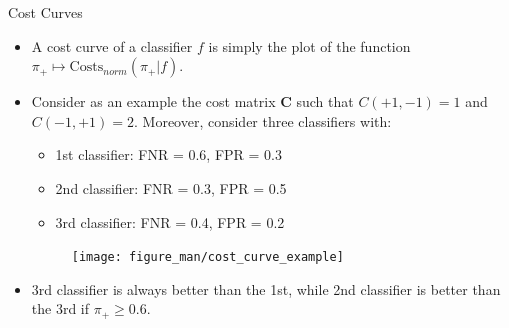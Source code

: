 		\begin{frame}{Cost Curves}
		\footnotesize
			\begin{itemize}
				\item A cost curve of a classifier $f$ is simply the plot of the function $\pi_+ \mapsto \mathrm{Costs}_{norm}(\pi_+ | f).$
				\item Consider as an example the cost matrix $\mathbf{C}$ such that $C(+1,-1)  = 1$ and $C(-1,+1) = 2.$ Moreover, consider three classifiers with:
				\begin{minipage}{0.45\textwidth}
					\begin{itemize}
						\scriptsize
						\item 1st classifier: FNR = 0.6, FPR = 0.3
						\item {\color{red} 2nd classifier}: FNR = 0.3, FPR = 0.5
						\item {\color{green} 3rd classifier}: FNR = 0.4, FPR = 0.2
					\end{itemize}
				\end{minipage}
				\begin{minipage}{0.45\textwidth}
					\begin{figure}
						\centering
						\texttt{[image: figure\_man/cost\_curve\_example]}
					\end{figure}
				\end{minipage}
%			
				\item 3rd classifier is always better than the 1st, while 2nd classifier is better than the 3rd if $\pi_+\geq 0.6.$
			
			\end{itemize}
	\end{frame}

